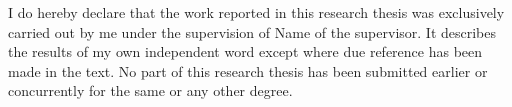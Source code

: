 \begin{declaration}      
	
	
    I do hereby declare that the work reported in this research thesis was exclusively carried out by me under the supervision of {Name of the supervisor}. It describes the results of my own independent word except where due reference has been made in the text. No part of this research thesis has been submitted earlier or concurrently for the same or any other degree.
	
	
\end{declaration}